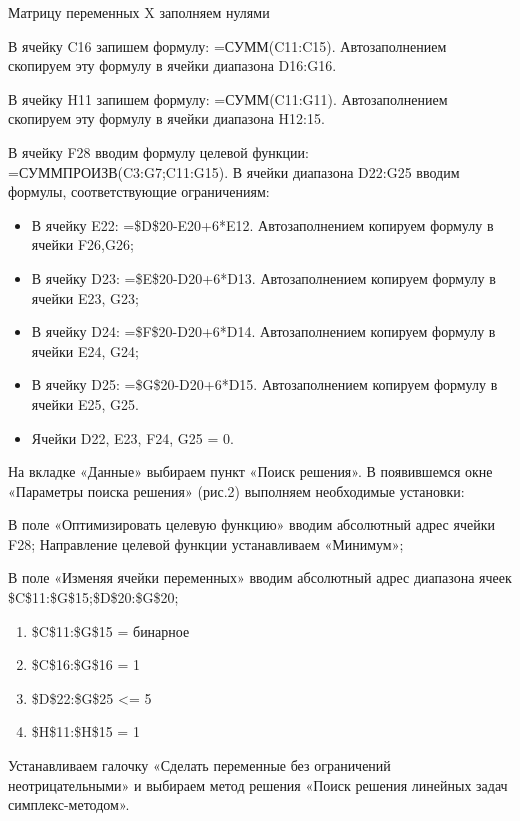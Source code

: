 \documentclass[a4paper, 12pt]{article}
\begin{document}
Матрицу переменных X заполняем нулями 

В ячейку C16 запишем формулу: =СУММ(C11:C15). Автозаполнением скопируем эту формулу в ячейки диапазона D16:G16. 

В ячейку H11 запишем формулу: =СУММ(C11:G11). Автозаполнением скопируем эту формулу в ячейки диапазона H12:15. 

В ячейку F28 вводим формулу целевой функции: =СУММПРОИЗВ(C3:G7;C11:G15). В ячейки диапазона D22:G25 вводим формулы, соответствующие ограничениям: 
\begin{itemize}
	\item В ячейку E22: =\$D\$20-E20+6*E12. Автозаполнением копируем формулу в ячейки F26,G26; 
	\item В ячейку D23: =\$E\$20-D20+6*D13. Автозаполнением копируем формулу в ячейки E23, G23; 
	\item В ячейку D24: =\$F\$20-D20+6*D14. Автозаполнением копируем формулу в ячейки E24, G24; 
	\item В ячейку D25: =\$G\$20-D20+6*D15. Автозаполнением копируем формулу в ячейки E25, G25. 
	\item Ячейки D22, E23, F24, G25 = 0.
\end{itemize}

На вкладке «Данные» выбираем пункт «Поиск решения». В появившемся окне «Параметры поиска решения» (рис.2) выполняем необходимые установки: 

В поле «Оптимизировать целевую функцию» вводим абсолютный адрес ячейки F28; Направление целевой функции устанавливаем «Минимум»; 

В поле «Изменяя ячейки переменных» вводим абсолютный адрес диапазона ячеек \\\$C\$11:\$G\$15;\$D\$20:\$G\$20;
\begin{enumerate}
\item\$C\$11:\$G\$15 = бинарное 
\item\$C\$16:\$G\$16 = 1 
\item\$D\$22:\$G\$25 <= 5 
\item\$H\$11:\$H\$15 = 1 
\end{enumerate}
Устанавливаем галочку «Сделать переменные без ограничений неотрицательными» и выбираем метод решения «Поиск решения линейных задач симплекс-методом».\\
\end{document}
